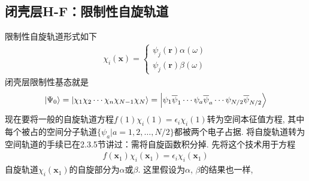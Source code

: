 \subsection{闭壳层H-F：限制性自旋轨道}\label{sec3.4.1}
限制性自旋轨道形式如下
\begin{align}\label{3.110}
	\chi_i(\mathbf{x}) =
	\begin{cases*}
		\psi_j(\mathbf{r})\alpha(\omega)\\
		\psi_j(\mathbf{r})\beta(\omega)
	\end{cases*}
\end{align}
闭壳层限制性基态就是
\begin{align}\label{3.111}
	\Ket{\Psi_0} = \Ket{\chi_1\chi_2\cdots\chi_n\chi_{N-1}\chi_N} = \Ket{\psi_1\overline{\psi}_1\cdots\psi_a\overline{\psi}_a\cdots\psi_{N/2}\overline{\psi}_{N/2}}
\end{align}
现在要将一般的自旋轨道\hft 方程$f(1)\chi_i(1)=\epsilon_i\chi_i(1)$转为空间本征值方程, 
其中每个被占的空间分子轨道$\{\psi_a|a=1,2,\ldots,N/2\}$都被两个电子占据. 
将自旋轨道转为空间轨道的手续已在2.3.5节讲过：需将自旋函数积分掉. 
先将这个技术用于\hft 方程
\begin{align}\label{3.112}
	f(\mathbf{x}_1)\chi_i(\mathbf{x}_1) = \epsilon_i\chi_i(\mathbf{x}_1)
\end{align}
自旋轨道$\chi_i(\mathbf{x}_1)$的自旋部分为$\alpha$或$\beta$. 
这里假设为$\alpha$, 
$\beta$的结果也一样,

